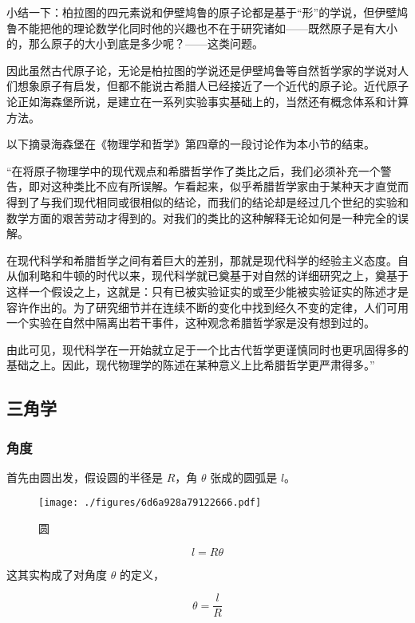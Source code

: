 小结一下：柏拉图的四元素说和伊壁鸠鲁的原子论都是基于“形”的学说，但伊壁鸠鲁不能把他的理论数学化同时他的兴趣也不在于研究诸如——既然原子是有大小的，那么原子的大小到底是多少呢？——这类问题。

因此虽然古代原子论，无论是柏拉图的学说还是伊壁鸠鲁等自然哲学家的学说对人们想象原子有启发，但都不能说古希腊人已经接近了一个近代的原子论。近代原子论正如海森堡所说，是建立在一系列实验事实基础上的，当然还有概念体系和计算方法。

以下摘录海森堡在《物理学和哲学》第四章的一段讨论作为本小节的结束。

“在将原子物理学中的现代观点和希腊哲学作了类比之后，我们必须补充一个警告，即对这种类比不应有所误解。乍看起来，似乎希腊哲学家由于某种天才直觉而得到了与我们现代相同或很相似的结论，而我们的结论却是经过几个世纪的实验和数学方面的艰苦劳动才得到的。对我们的类比的这种解释无论如何是一种完全的误解。

在现代科学和希腊哲学之间有着巨大的差别，那就是现代科学的经验主义态度。自从伽利略和牛顿的时代以来，现代科学就已奠基于对自然的详细研究之上，奠基于这样一个假设之上，这就是：只有已被实验证实的或至少能被实验证实的陈述才是容许作出的。为了研究细节并在连续不断的变化中找到经久不变的定律，人们可用一个实验在自然中隔离出若干事件，这种观念希腊哲学家是没有想到过的。

由此可见，现代科学在一开始就立足于一个比古代哲学更谨慎同时也更巩固得多的基础之上。因此，现代物理学的陈述在某种意义上比希腊哲学更严肃得多。”

\subsection{三角学}

\subsubsection{角度}

首先由圆出发，假设圆的半径是 $R$，角 $\theta$ 张成的圆弧是 $l$。

\begin{figure}[ht]
\centering
\texttt{[image: ./figures/6d6a928a79122666.pdf]}
\caption{圆} \label{fig_AtomId_3}
\end{figure}

\begin{equation}
l = R \theta
\end{equation}

这其实构成了对角度 $\theta$ 的定义，

\begin{equation}
\theta = \frac{l }{R }
\end{equation}

